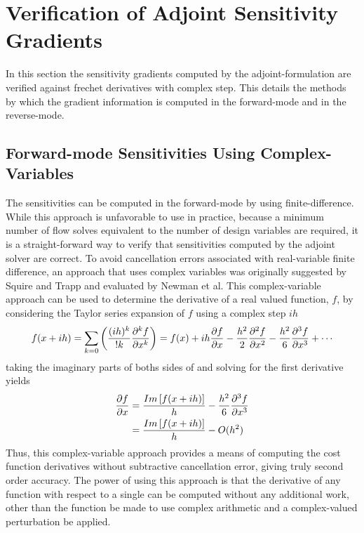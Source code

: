 \chapter{Verification of Adjoint Sensitivity Gradients}
\label{chapter-six}

In this section the sensitivity gradients computed by the adjoint-formulation
are verified against frechet derivatives with complex step.  This details the
methods by which the gradient information is computed in the forward-mode and in
the reverse-mode.

\section{Forward-mode Sensitivities Using Complex-Variables}

The sensitivities can be computed in the forward-mode by using
finite-difference.  While this approach is unfavorable to use in practice,
because a minimum number of flow solves equivalent to the number of design
variables are required, it is a straight-forward way to verify that
sensitivities computed by the adjoint solver are correct.  To avoid cancellation
errors associated with real-variable finite difference, an approach that uses
complex variables was originally suggested by Squire and Trapp\cite{squire1998}
and evaluated by Newman et al\cite{newman1998}.  This complex-variable approach
can be used to determine the derivative of a real valued function, $f$, by
considering the Taylor series expansion of $f$ using a complex step $ih$
\begin{equation}
  f(x + ih) = \sum_{k=0}\left( \frac{(ih)^k}{!k}\pnd{f}{x}{k} \right)
            = f(x) + ih\pd{f}{x} - \frac{h^2}{2}\pnd{f}{x}{2}
            - \frac{h^2}{6}\pnd{f}{x}{3} + \cdots
  \label{taylor-exp}
\end{equation}
taking the imaginary parts of boths sides of  and solving for
the first derivative yields
\begin{equation}
  \begin{aligned}
    \frac{\partial f}{\partial x} &= \frac{Im\left[ f(x + ih) \right]}{h} -
    \frac{h^2}{6}\frac{\partial^{3} f}{\partial x^{3}} \\
              &= \frac{Im\left[ f(x + ih) \right]}{h} - O(h^2)
  \end{aligned}
  \label{complex-fd}
\end{equation}
Thus, this complex-variable approach provides a means of computing the cost
function derivatives without subtractive cancellation error, giving truly second
order accuracy.  The power of using this approach is that the derivative of any
function with respect to a single can be computed without any additional work,
other than the function be made to use complex arithmetic and a complex-valued
perturbation be applied.

